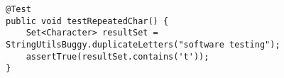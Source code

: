 \verb$@Test$\\
\verb$public void testRepeatedChar() {$\\
\verb$    Set<Character> resultSet = StringUtilsBuggy.duplicateLetters("software testing");$\\
\verb$    assertTrue(resultSet.contains('t'));$\\
\verb$}$\\
